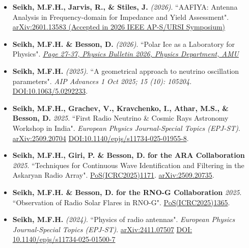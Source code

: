 \documentclass[10pt]{report}
\begin{document}
\begin{itemize}
    \item \textbf{Seikh, M.F.H., Jarvis, R., \& Stiles, J.} {\it (2026)}. ``AAFIYA: Antenna Analysis in Frequency-domain for Impedance and Yield Assessment". \href{https://doi.org/10.48550/arXiv.2601.13583}{arXiv:2601.13583 (Accepted in 2026 IEEE AP-S/URSI Symposium)}

    \vspace{0.1em}
    \noindent
    \item \textbf{Seikh, M.F.H. \& Besson, D.} {\it (2026)}. ``Polar Ice as a Laboratory for Physics". \href{https://drive.google.com/file/d/1eny09TjrDmNsoqKf86RbFbMdMi_LdEsB/view?usp=share_link}{\textit{Page 27-37, Physics Bulletin 2026, Physics Department, AMU}}

    \vspace{0.1em}
    \noindent
    \item \textbf{Seikh, M.F.H.} {\it (2025)}. ``A geometrical approach to neutrino oscillation parameters". {\it AIP Advances 1 Oct 2025; 15 (10): 105204}. \href{https://doi.org/10.1063/5.0292233}{DOI:10.1063/5.0292233}.

    \vspace{0.1em}
    \noindent
    \item {\bf Seikh, M.F.H., Grachev, V., Kravchenko, I., Athar, M.S., \&  Besson, D.} {\it {2025}}. ``First Radio Neutrino \& Cosmic Rays Astronomy Workshop in India". \textit{European Physics Journal-Special Topics (EPJ-ST)}. \href{https://arxiv.org/abs/2509.20704}{arXiv:2509.20704} \href{https://doi.org/10.1140/epjs/s11734-025-01955-8}{DOI:10.1140/epjs/s11734-025-01955-8}.

    \vspace{0.1em}
    \noindent
    \item {\bf Seikh, M.F.H., Giri, P. \& Besson, D. for the ARA Collaboration} {\it {2025}}. ``Techniques for Continuous Wave Identification and Filtering in the Askaryan Radio Array". \href{https://pos.sissa.it/501/1171/pdf}{PoS(ICRC2025)1171}. \href{https://arxiv.org/abs/2509.20735}{arXiv:2509.20735}.

    \vspace{0.1em}
    \noindent
    \item {\bf Seikh, M.F.H. \& Besson, D. for the RNO-G Collaboration} {\it {2025}}. ``Observation of Radio Solar Flares in RNO-G". \href{https://pos.sissa.it/501/1365/pdf}{PoS(ICRC2025)1365}. 

    \vspace{0.1em}
    \noindent
    \item \textbf{Seikh, M.F.H.} {\it (2024)}. ``Physics of radio antennas". \textit{European Physics Journal-Special Topics (EPJ-ST)}. \href{https://arxiv.org/abs/2411.07507}{arXiv:2411.07507} \href{https://doi.org/10.1140/epjs/s11734-025-01500-7}{DOI: 10.1140/epjs/s11734-025-01500-7}
    

\end{itemize}
\end{document}
